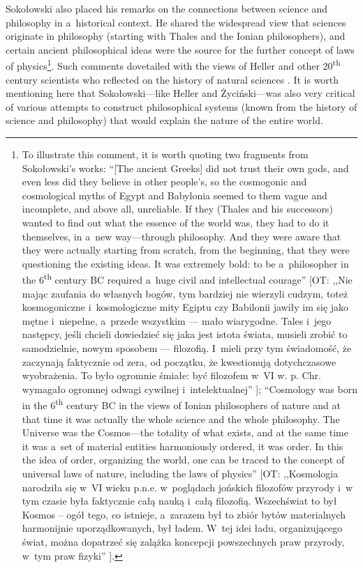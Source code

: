 \documentclass[%
  manuscript=article,
  year=2024,
  volume=77,
  doi=00000.000,
]{zfn}
\begin{document}
Sokołowski also placed his remarks on the connections between science and philosophy in a~historical context. He shared the widespread view that sciences originate in philosophy (starting with Thales and the Ionian philosophers), and certain ancient philosophical ideas were the source for the further concept of laws of physics\footnote{To illustrate this comment, it is worth quoting two fragments from Sokołowski's works: ``[The ancient Greeks] did not trust their own gods, and even less did they believe in other people's, so the cosmogonic and cosmological myths of Egypt and Babylonia seemed to them vague and incomplete, and above all, unreliable. If they (Thales and his successors) wanted to find out what the essence of the world was, they had to do it themselves, in a~new way---through philosophy. And they were aware that they were actually starting from scratch, from the beginning, that they were questioning the existing ideas. It was extremely bold: to be a~philosopher in the 6\textsuperscript{th} century BC required a~huge civil and intellectual courage'' [OT: ,,Nie mając zaufania do własnych bogów, tym bardziej nie wierzyli cudzym, toteż kosmogoniczne i~kosmologiczne mity Egiptu czy Babilonii jawiły im się jako mętne i~niepełne, a~przede wszystkim --- mało wiarygodne. Tales i~jego następcy, jeśli chcieli dowiedzieć się jaka jest istota świata, musieli zrobić to samodzielnie, nowym sposobem --- filozofią. I~mieli przy tym świadomość, że zaczynają faktycznie od zera, od początku, że kwestionują dotychczasowe wyobrażenia. To było ogromnie śmiałe: być filozofem w~VI w. p. Chr. wymagało ogromnej odwagi cywilnej i~intelektualnej'' 
\parencite[][p.44]{}%
]; ``Cosmology was born in the 6\textsuperscript{th} century BC in the views of Ionian philosophers of nature and at that time it was actually the whole science and the whole philosophy. The Universe was the Cosmos---the totality of what exists, and at the same time it was a~set of material entities harmoniously ordered, it was order. In this the idea of order, organizing the world, one can be traced to the concept of universal laws of nature, including the laws of physics'' [OT: ,,Kosmologia narodziła się w~VI wieku p.n.e. w~poglądach jońskich filozofów przyrody i~w tym czasie była faktycznie całą nauką i~całą filozofią. Wszechświat to był Kosmos -- ogół tego, co istnieje, a~zarazem był to zbiór bytów materialnych harmonijnie uporządkowanych, był ładem. W~tej idei ładu, organizującego świat, można dopatrzeć się zalążka koncepcji powszechnych praw przyrody, w~tym praw fizyki'' 
\parencite[][p.28]{}%
]. }. Such comments dovetailed with the views of Heller 
\parencite[][]{Heller1992Filozofia} %
 and other 20\textsuperscript{th} century scientists who reflected on the history of natural sciences 
\parencites[][]{Wilson2011Konsiliencja}[][]{}. %
 It is worth mentioning here that Sokołowski---like Heller and Życiński---was also very critical of various attempts to construct philosophical systems (known from the history of science and philosophy) that would explain the nature of the entire world.
\end{document}
